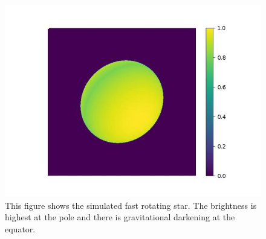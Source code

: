 \begin{figure}
	\centering
	\includegraphics[width=\linewidth]{fig/ellipse/ellipse1612.jpg}
	\caption{This figure shows the simulated fast rotating star. The brightness is highest at the pole and there is gravitational darkening at the equator.}
	\label{fig:image}
\end{figure}
